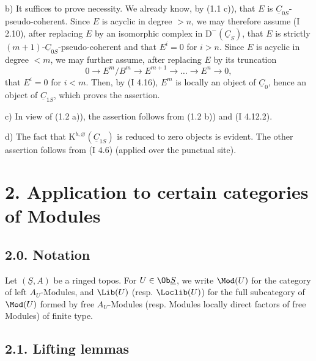 b) It suffices to prove necessity. We already know, by (1.1 c)), that $E$ is $\underline{C}_{0S}$-pseudo-coherent. Since $E$ is acyclic in degree $>n$, we may therefore assume (I 2.10), after replacing $E$ by an isomorphic complex in $\mathrm D^{-}(\underline{C}_S)$, that $E$ is strictly $(m+1)$-$\underline{C}_{0S}$-pseudo-coherent and that $E^i=0$ for $i>n$. Since $E$ is acyclic in degree $<m$, we may further assume, after replacing $E$ by its truncation
\[
0\longrightarrow E^m/B^m\longrightarrow E^{m+1}\longrightarrow\ldots\longrightarrow E^n\longrightarrow0,
\]
that $E^i=0$ for $i<m$. Then, by (I 4.16), $E^m$ is locally an object of $\underline{C}_0$, hence an object of $\underline{C}_{1S}$, which proves the assertion.

%
c)
In view of (1.2 a)), the assertion follows from (1.2 b)) and (I 4.12.2).

d) The fact that $\mathrm K^{b,\varnothing}(\underline{C}_{1S})$ is reduced to zero objects is evident. The other assertion follows from (I 4.6) (applied over the punctual site).

\section*{2. Application to certain categories of Modules}
\subsection*{2.0. Notation}
Let $(\underline{S},A)$ be a ringed topos. For $U\in\Ob \underline{S}$, we write $\Mod(U)$ for the category of left $A_U$-Modules, and $\Lib(U)$ (resp. $\Loclib(U)$) for the full subcategory of $\Mod(U)$ formed by free $A_U$-Modules (resp. Modules locally direct factors of free Modules) of finite type.

\subsection*{2.1. Lifting lemmas}

